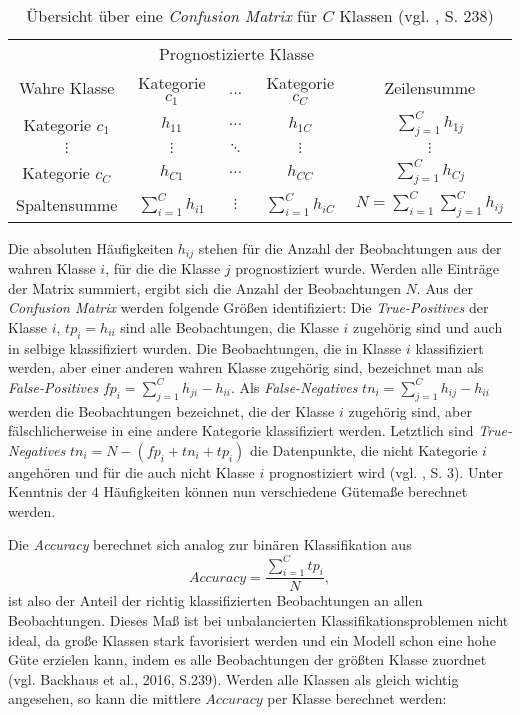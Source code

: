 \documentclass[a4paper,11pt]{article}
\begin{document}
\begin{table}[ht]
\begin{center}
\begin{tabular}{|c|ccc|c|}
  \hline
 & \multicolumn{3}{|c|}{Prognostizierte Klasse} &  \\
Wahre Klasse & Kategorie $c_1$ & ...  & Kategorie $c_C$ & Zeilensumme  \\ 
  \hline
Kategorie $c_1$ & $h_{11}$ & $\hdots$ & $h_{1C}$ & $\sum_{j=1}^C h_{1j}$\\
$\vdots$ & $\vdots$ & $\ddots$ & $\vdots$ & $\vdots$ \\
Kategorie $c_C$ & $h_{C1}$ & $\hdots$ & $h_{CC}$ & $\sum_{j=1}^C h_{Cj}$\\
\hline
Spaltensumme & $\sum_{i=1}^C h_{i1}$ & $\vdots$ & $\sum_{i=1}^C h_{iC}$ & 
$N = \sum_{i=1}^C \sum_{j=1}^C h_{ij}$\\
   \hline
\end{tabular}

  \caption{Übersicht über eine \textit{Confusion Matrix}  für $C$  Klassen (vgl. \cite{backhaus}, S. 238)}  
  \label{tab:confusionMatrix}
\end{center}
\end{table}

Die absoluten Häufigkeiten $h_{ij}$ stehen für die Anzahl der Beobachtungen aus der wahren Klasse $i$, für die die Klasse $j$ prognostiziert wurde. Werden alle Einträge der Matrix summiert, ergibt sich die Anzahl der Beobachtungen $N$. Aus der \textit{Confusion Matrix} werden folgende Größen identifiziert: Die \textit{True-Positives} der Klasse $i$, $tp_i = h_{ii}$ sind alle Beobachtungen, die Klasse $i$ zugehörig sind und auch in selbige klassifiziert wurden. Die Beobachtungen, die in Klasse $i$ klassifiziert werden, aber einer anderen wahren Klasse zugehörig sind, bezeichnet man als \textit{False-Positives} $fp_i = \sum_{j = 1}^C h_{ji} - h_{ii}$. Als \textit{False-Negatives} $tn_i = \sum_{j = 1}^C h_{ij} - h_{ii}$ werden die Beobachtungen bezeichnet, die der Klasse $i$ zugehörig sind, aber fälschlicherweise in eine andere Kategorie klassifiziert werden. Letztlich sind \textit{True-Negatives} $tn_i = N - (fp_i + tn_i + tp_i)$ die Datenpunkte, die nicht Kategorie $i$ angehören und für die auch nicht Klasse $i$ prognostiziert wird (vgl. \cite{sokolova}, S. 3). Unter Kenntnis der $4$ Häufigkeiten können nun verschiedene Gütemaße berechnet werden. 


Die \textit{Accuracy} berechnet sich analog zur binären Klassifikation aus 
\[ Accuracy = \frac{\sum_{i=1}^C tp_i}{N},  \]
ist also der Anteil der richtig klassifizierten Beobachtungen an allen Beobachtungen. Dieses Maß ist bei unbalancierten Klassifikationsproblemen nicht ideal, da große Klassen stark favorisiert werden und ein Modell schon eine hohe Güte erzielen kann, indem es alle Beobachtungen der größten Klasse zuordnet (vgl. Backhaus et al., 2016, S.239). Werden alle Klassen als gleich wichtig angesehen, so kann die mittlere $Accuracy$ per Klasse berechnet werden: 
\end{document}
